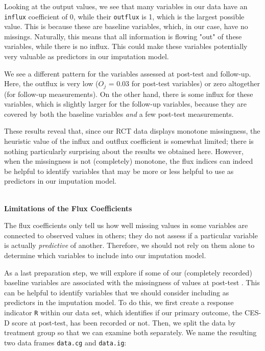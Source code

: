 Looking at the output values, we see that many variables in our data have an \texttt{influx} coefficient of 0, while their \texttt{outflux} is 1, which is the largest possible value. This is because these are baseline variables, which, in our case, have no missings. Naturally, this means that all information is flowing "out" of these variables, while there is no influx. This could make these variables potentially very valuable as predictors in our imputation model. 

We see a different pattern for the variables assessed at post-test and follow-up. Here, the outflux is very low ($O_j$ = 0.03 for post-test variables) or zero altogether (for follow-up measurements). On the other hand, there is some influx for these variables, which is slightly larger for the follow-up variables, because they are covered by both the baseline variables \emph{and} a few post-test measurements. 

These results reveal that, since our RCT data displays monotone missingness, the heuristic value of the influx and outflux coefficient is somewhat limited; there is nothing particularly surprising about the results we obtained here. However, when the missingness is not (completely) monotone, the flux indices can indeed be helpful to identify variables that may be more or less helpful to use as predictors in our imputation model.

\begin{box-important} \\
\textcolor{burgundyred}{\textbf{Limitations of the Flux Coefficients}} 

\vspace{2mm}

The flux coefficients only tell us how well missing values in some variables are connected to observed values in others; they do not assess if a particular variable is actually \emph{predictive} of another. Therefore, we should not rely on them alone to determine which variables to include into our imputation model.
\end{box-important}

As a last preparation step, we will explore if some of our (completely recorded) baseline variables are associated with the missingness of values at post-test \citep[see e.g.][]{carpenter2021missing}. This can be helpful to identify variables that we should consider including as predictors in the imputation model. To do this, we first create a response indicator \texttt{R} within our data set, which identifies if our primary outcome, the CES-D score at post-test, has been recorded or not. Then, we split the data by treatment group so that we can examine both separately. We name the resulting two data frames \texttt{data.cg} and \texttt{data.ig}:

